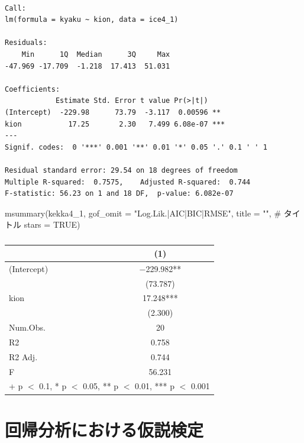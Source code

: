 \documentclass[
  letterpaper,
  DIV=11,
  numbers=noendperiod]{scrreprt}
\newenvironment{Shaded}{\begin{snugshade}}{\end{snugshade}}
\newcommand{\AttributeTok}[1]{\textcolor[rgb]{0.40,0.45,0.13}{#1}}
\newcommand{\CommentTok}[1]{\textcolor[rgb]{0.37,0.37,0.37}{#1}}
\newcommand{\ConstantTok}[1]{\textcolor[rgb]{0.56,0.35,0.01}{#1}}
\newcommand{\FunctionTok}[1]{\textcolor[rgb]{0.28,0.35,0.67}{#1}}
\newcommand{\NormalTok}[1]{\textcolor[rgb]{0.00,0.23,0.31}{#1}}
\newcommand{\StringTok}[1]{\textcolor[rgb]{0.13,0.47,0.30}{#1}}
\begin{document}
\begin{verbatim}

Call:
lm(formula = kyaku ~ kion, data = ice4_1)

Residuals:
    Min      1Q  Median      3Q     Max 
-47.969 -17.709  -1.218  17.413  51.031 

Coefficients:
            Estimate Std. Error t value Pr(>|t|)    
(Intercept)  -229.98      73.79  -3.117  0.00596 ** 
kion           17.25       2.30   7.499 6.08e-07 ***
---
Signif. codes:  0 '***' 0.001 '**' 0.01 '*' 0.05 '.' 0.1 ' ' 1

Residual standard error: 29.54 on 18 degrees of freedom
Multiple R-squared:  0.7575,    Adjusted R-squared:  0.744 
F-statistic: 56.23 on 1 and 18 DF,  p-value: 6.082e-07
\end{verbatim}

\begin{Shaded}
\begin{Highlighting}[]
\FunctionTok{msummary}\NormalTok{(kekka4\_1,}
         \AttributeTok{gof\_omit =} \StringTok{"Log.Lik.|AIC|BIC|RMSE"}\NormalTok{,}
         \AttributeTok{title =} \StringTok{""}\NormalTok{,          }\CommentTok{\# タイトル}
         \AttributeTok{stars =} \ConstantTok{TRUE}\NormalTok{)}
\end{Highlighting}
\end{Shaded}

\begin{table}

\caption{}
\centering
\begin{tabular}[t]{lc}
\toprule
  & (1)\\
\midrule
(Intercept) & \num{-229.982}**\\
 & (\num{73.787})\\
kion & \num{17.248}***\\
 & (\num{2.300})\\
\midrule
Num.Obs. & \num{20}\\
R2 & \num{0.758}\\
R2 Adj. & \num{0.744}\\
F & \num{56.231}\\
\bottomrule
\multicolumn{2}{l}{\rule{0pt}{1em}+ p $<$ 0.1, * p $<$ 0.05, ** p $<$ 0.01, *** p $<$ 0.001}\\
\end{tabular}
\end{table}

\hypertarget{ux56deux5e30ux5206ux6790ux306bux304aux3051ux308bux4eeeux8aacux691cux5b9a}{%
\chapter{回帰分析における仮説検定}\label{ux56deux5e30ux5206ux6790ux306bux304aux3051ux308bux4eeeux8aacux691cux5b9a}}
\end{document}
